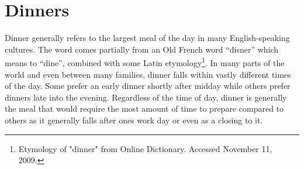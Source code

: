\AddToShipoutPicture*{\Steak}
\chapter{Dinners}

Dinner generally refers to the largest meal of the day in many English-speaking cultures. The word comes partially from an Old French word ``disner'' which means to ``dine'', combined with some Latin etymology\footnote{Etymology of "dinner" from Online Dictionary. Accessed November 11, 2009.}. In many parts of the world and even between many families, dinner falls within vastly different times of the day. Some prefer an early dinner shortly after midday while others prefer dinners late into the evening. Regardless of the time of day, dinner is generally the meal that would require the most amount of time to prepare compared to others as it generally falls after ones work day or even as a closing to it.